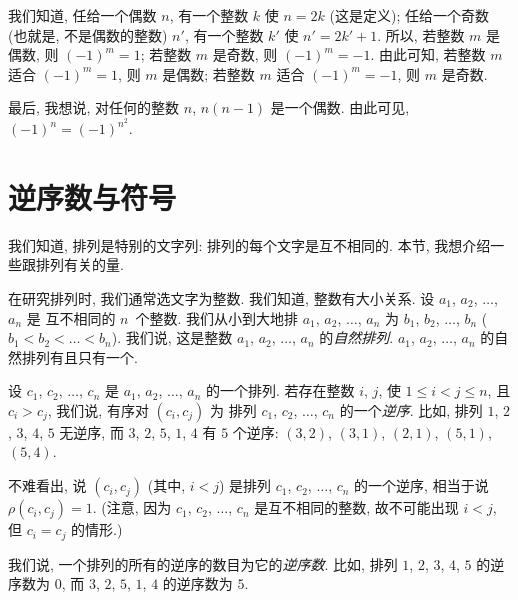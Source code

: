\documentclass[../libro.tex]{subfiles}
\begin{document}
我们知道, 任给一个偶数 \(n\),
有一个整数 \(k\) 使 \(n = 2k\)
(这是定义);
任给一个奇数 (也就是, 不是偶数的整数) \(n'\),
有一个整数 \(k'\) 使 \(n' = 2k' + 1\).
所以,
若整数 \(m\) 是偶数, 则 \((-1)^m = 1\);
若整数 \(m\) 是奇数, 则 \((-1)^m = -1\).
由此可知,
若整数 \(m\) 适合 \((-1)^m = 1\),
则 \(m\) 是偶数;
若整数 \(m\) 适合 \((-1)^m = -1\),
则 \(m\) 是奇数.

最后, 我想说,
对任何的整数 \(n\),
\(n(n-1)\) 是一个偶数.
由此可见, \((-1)^n = (-1)^{n^2}\).

\KunAsteriskoEnEnhavtabelo
\section{逆序数与符号}
\SenAsteriskoEnEnhavtabelo

\maldevigalegajxo

我们知道, 排列是特别的文字列:
排列的每个文字是互不相同的.
本节, 我想介绍一些跟排列有关的量.

在研究排列时, 我们通常选文字为整数.
我们知道, 整数有大小关系.
设 \(a_1\), \(a_2\), \(\dots\), \(a_n\) 是%
互不相同的 \(n\)~个整数.
我们从小到大地排
\(a_1\), \(a_2\), \(\dots\), \(a_n\)
为
\(b_1\), \(b_2\), \(\dots\), \(b_n\)
(\(b_1 < b_2 < \dots < b_n\)).
我们说, 这是整数 \(a_1\), \(a_2\), \(\dots\), \(a_n\)
的\emph{自然排列}.
\(a_1\), \(a_2\), \(\dots\), \(a_n\)
的自然排列有且只有一个.

设
\(c_1\), \(c_2\), \(\dots\), \(c_n\)
是 \(a_1\), \(a_2\), \(\dots\), \(a_n\) 的一个排列.
若存在整数 \(i\), \(j\),
使 \(1 \leq i < j \leq n\),
且 \(c_i > c_j\),
我们说, 有序对 \((c_i, c_j)\) 为%
排列 \(c_1\), \(c_2\), \(\dots\), \(c_n\)
的一个\emph{逆序}.
比如, 排列 \(1\), \(2\), \(3\), \(4\), \(5\) 无逆序,
而 \(3\), \(2\), \(5\), \(1\), \(4\) 有 \(5\) 个逆序:
\((3, 2)\), \((3, 1)\), \((2, 1)\), \((5, 1)\), \((5, 4)\).

不难看出,
说 \((c_i, c_j)\) (其中, \(i < j\))
是排列
\(c_1\), \(c_2\), \(\dots\), \(c_n\)
的一个逆序,
相当于说 \(\rho(c_i, c_j) = 1\).
(注意, 因为 %
\(c_1\), \(c_2\), \(\dots\), \(c_n\)
是互不相同的整数,
故不可能出现
\(i < j\),
但 \(c_i = c_j\) 的情形.) %

我们说, 一个排列的所有的逆序的数目为它的\emph{逆序数}.
比如, 排列 \(1\), \(2\), \(3\), \(4\), \(5\) 的逆序数为 \(0\),
而 \(3\), \(2\), \(5\), \(1\), \(4\) 的逆序数为 \(5\).
\end{document}
